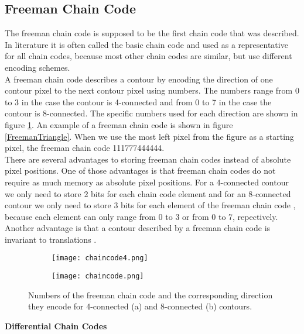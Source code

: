 \documentclass[thesis.tex]{subfiles}
\begin{document}
\subsection{Freeman Chain Code} \label{freeman}
The freeman chain code \cite{freeman} is supposed to be the first chain code that was described. In literature it is often called the basic chain code and used as a representative for all chain codes, because most other chain codes are similar, but use different encoding schemes. \\ A freeman chain code describes a contour by encoding the direction of one contour pixel to the next contour pixel using numbers. The numbers range from 0 to 3 in the case the contour is 4-connected and from 0 to 7 in the case the contour is 8-connected. The specific numbers used for each direction are shown in figure \ref{fig:freeman}. An example of a freeman chain code is shown in figure \ref{FreemanTriangle}. When we use the most left pixel from the figure as a starting pixel, the freeman chain code 111777444444. \\  
There are several advantages to storing freeman chain codes instead of absolute pixel positions. One of those advantages is that freeman chain codes do not require as much memory as absolute pixel positions. For a 4-connected contour we only need to store 2 bits for each chain code element and for an 8-connected contour we only need to store 3 bits for each element of the freeman chain code \cite{Ballard:1982:CV:578131}, because each element can only range from 0 to 3 or from 0 to 7, repectively. Another advantage is that a contour described by a freeman chain code is invariant to translations \cite{yang2008su}. \\
\begin{figure}
	\begin{subfigure}[t]{0.4\textwidth}
		\texttt{[image: chaincode4.png]}
	\caption{}		
	\end{subfigure}
\hspace{0.1\textwidth}
	\begin{subfigure}[t]{0.4\textwidth}
		\texttt{[image: chaincode.png]}		
\caption{}	
	\end{subfigure}
	\caption{Numbers of the freeman chain code  and the corresponding direction they encode for 4-connected (a) and 8-connected (b) contours.}
\label{fig:freeman}
\end{figure}

\textbf{Differential Chain Codes}
\end{document}
